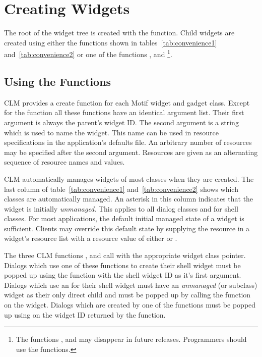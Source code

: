\section{Creating Widgets}

The root of the widget tree is created with the 
function.  Child widgets are created using either the 
functions shown in tables~\ref{tab:convenience1} and~\ref{tab:convenience2}
or one of the functions
,  and
\footnote{The functions ,
 and  may disappear in
future releases.  Programmers should use the  functions.}. 

\subsection{Using the  Functions}\label{sec:createdotdotdot}

CLM provides a create function for each Motif widget and gadget class.  Except
for the function  all these functions have an
identical argument list.  Their first argument is always the parent's widget ID.
The second argument is a string which is used to name the widget.  This name can
be used in resource specifications in the application's defaults file.  An
arbitrary number of resources may be specified after the second argument. 
Resources are given as an alternating sequence of resource names and values. 

CLM automatically manages widgets of most classes when they are created.  The
last column of table~\ref{tab:convenience1} and~\ref{tab:convenience2} shows
which classes are automatically managed.  An asterisk in this column indicates
that the widget is initially {\em unmanaged}.  This applies to all dialog
classes and for shell classes.  For most applications, the default initial
managed state of a widget is sufficient.  Clients may override this default
state by supplying the resource  in a widget's resource list with a
resource value of either  or . 

The three CLM functions ,
 and  call
 with the appropriate widget class pointer.  Dialogs
which use one of these functions to create their shell widget must be popped up
using the function  with the shell widget ID as it's first argument.
Dialogs which use an  for their shell widget must have an
{\em unmanaged}  (or subclass) widget as their only
direct child and must be popped up by calling the function 
on the  widget.  Dialogs which are created by one of the
 functions must be popped up using 
on the widget ID returned by the  function. 

